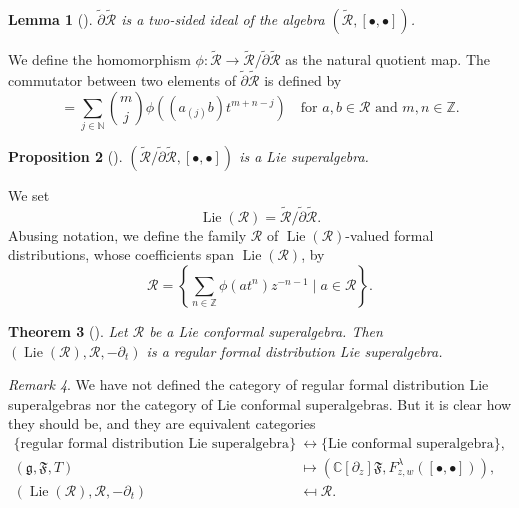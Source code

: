 \documentclass[a4paper, 12pt, reqno]{amsart}
\newtheorem{theorem}{Theorem}[section]
\newtheorem{lemma}[theorem]{Lemma}
\newtheorem{proposition}[theorem]{Proposition}
\theoremstyle{remark}
\newtheorem{remark}[theorem]{Remark}
\numberwithin{equation}{subsection}
\DeclareMathOperator{\Lie}{Lie}
\begin{document}
\begin{lemma}[{\cite[Proposition 2.6.1]{nozaradan_introduction_2008}}]
  \label{lmm:1}
  $\widetilde{\partial}\widetilde{\mathcal{R}}$ is a two-sided ideal of the algebra $(\widetilde{\mathcal{R}}, [\bullet, \bullet])$.
\end{lemma}

We define the homomorphism $\phi: \widetilde{\mathcal{R}} \to \widetilde{\mathcal{R}}/\widetilde{\partial}\widetilde{\mathcal{R}}$ as the natural quotient map.
The commutator between two elements of $\widetilde{\partial}\widetilde{\mathcal{R}}$ is defined by
\begin{equation*}
  [\phi(at^m), \phi(bt^n)] = \sum_{j \in \mathbb{N}}\binom{m}{j}\phi((a_{(j)}b)t^{m + n - j}) \quad \text{for }a, b \in \mathcal{R}\text{ and }m, n \in \mathbb{Z}.
\end{equation*}

\begin{proposition}[{\cite[Proposition 2.6.3]{nozaradan_introduction_2008}}]
  \label{prp:5}
  $(\widetilde{\mathcal{R}}/\widetilde{\partial}\widetilde{\mathcal{R}}, [\bullet, \bullet])$ is a Lie superalgebra.
\end{proposition}

We set
\begin{equation*}
  \Lie(\mathcal{R}) = \widetilde{\mathcal{R}}/\widetilde{\partial}\widetilde{\mathcal{R}}.
\end{equation*}
Abusing notation, we define the family $\mathcal{R}$ of $\Lie(\mathcal{R})$-valued formal distributions, whose coefficients span $\Lie(\mathcal{R})$, by
\begin{equation*}
  \mathcal{R} = \left\{\sum_{n \in \mathbb{Z}}\phi(at^n)z^{-n - 1} \mid a \in \mathcal{R}\right\}.
\end{equation*}

\begin{theorem}[{\cite[Proposition 2.6.4]{nozaradan_introduction_2008}}]
  \label{thr:9}
  Let $\mathcal{R}$ be a Lie conformal superalgebra.
  Then $(\Lie(\mathcal{R}), \mathcal{R}, -\partial_t)$ is a regular formal distribution Lie superalgebra.
\end{theorem}

\begin{remark}
  \label{rmk:7}
  We have not defined the category of regular formal distribution Lie superalgebras nor the category of Lie conformal superalgebras.
  But it is clear how they should be, and they are equivalent categories
  \begin{align*}
    \{\text{regular formal distribution Lie superalgebra}\} &\leftrightarrow \{\text{Lie conformal superalgebra}\}, \\
    (\mathfrak{g}, \mathfrak{F}, T) &\mapsto (\mathbb{C}[\partial_z]\mathfrak{F}, F^{\lambda}_{z, w}([\bullet, \bullet])), \\
    (\Lie(\mathcal{R}), \mathcal{R}, -\partial_t) &\mapsfrom \mathcal{R}.
  \end{align*}
\end{remark}
\end{document}
